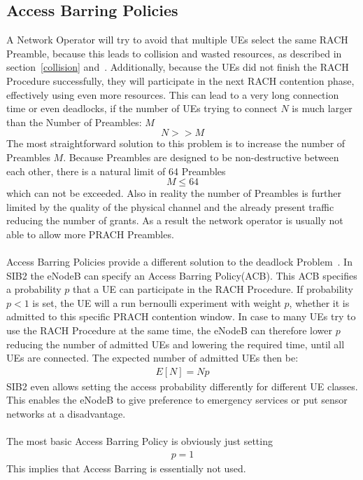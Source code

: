 \documentclass[conference]{IEEEtran}
\begin{document}
\subsection{Access Barring Policies}\label{ACB}
A Network Operator will try to avoid that multiple UEs select the same RACH Preamble, because this leads to collision and wasted resources, as described in section~\ref{collision} and~\cite{3GPP_TR_37.868}.
Additionally, because the UEs did not finish the RACH Procedure successfully, they will participate in the next RACH contention phase, effectively using even more resources.
This can lead to a very long connection time or even deadlocks, if the number of UEs trying to connect $N$ is much larger than the Number of Preambles: $M$ \[N>>M\]
The most straightforward solution to this problem is to increase the number of Preambles $M$.
Because Preambles are designed to be non-destructive between each other, there is a natural limit of 64 Preambles \[M\leq64\] which can not be exceeded.
Also in reality the number of Preambles is further limited by the quality of the physical channel and the already present traffic reducing the number of grants.
As a result the network operator is usually not able to allow more PRACH Preambles.\\\\
Access Barring Policies provide a different solution to the deadlock Problem~\cite{3GPP_TR_37.868}.
In SIB2 the eNodeB can specify an Access Barring Policy(ACB).
This ACB specifies a probability $p$ that a UE can participate in the RACH Procedure.
If probability $p<1$ is set, the UE will a run bernoulli experiment with weight $p$, whether it is admitted to this specific PRACH contention window.
In case to many UEs try to use the RACH Procedure at the same time, the eNodeB can therefore lower $p$ reducing the number of admitted UEs and lowering the required time, until all UEs are connected.
The expected number of admitted UEs then be:
\begin{align}
    E[N]= Np
\end{align}
SIB2 even allows setting the access probability differently for different UE classes.
This enables the eNodeB to give preference to emergency services or put sensor networks at a disadvantage.\\\\
The most basic Access Barring Policy is obviously just setting
\begin{align}
    p=1
\end{align}
This implies that Access Barring is essentially not used.
\end{document}
